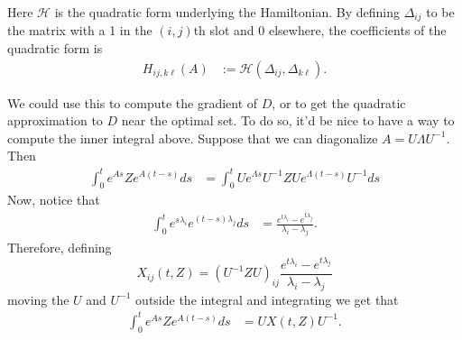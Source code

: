 \documentclass[9 pt]{article}
\newcommand{\calH}{\mathcal{H}}
\newcommand{\1}{\mathbbm{1}}
\begin{document}
Here $\calH$ is the quadratic form underlying the Hamiltonian.
By defining $\Delta_{ij}$ to be the matrix with a 1 in the $(i,j)$th slot
and 0 elsewhere,
the coefficients of the quadratic form is
\begin{equation}
    \begin{aligned}
        H_{ij, k\ell}(A)
        &:=
        \calH(\Delta_{ij}, \Delta_{k\ell}) .
    \end{aligned}
\end{equation}

We could use this to compute the gradient of $D$,
or to get the quadratic approximation to $D$ near the optimal set.
To do so, it'd be nice to have a way to compute the inner integral above.
Suppose that we can diagonalize $A = U \Lambda U^{-1}$.
Then
\begin{equation} \label{eqn:exp_deriv}
  \begin{aligned}
      \int_0^t e^{As} Z e^{A(t-s)} ds 
      &=
      \int_0^t U e^{\Lambda s} U^{-1} Z U e^{\Lambda (t-s)} U^{-1} ds 
  \end{aligned}
\end{equation}
Now, notice that
\begin{equation}
  \begin{aligned}
      \int_0^t e^{s \lambda_i} e^{(t-s) \lambda_j} ds
      &=
      \frac{ e^{t \lambda_i} - e^{t \lambda_j} }{ \lambda_i - \lambda_j } .
  \end{aligned}
\end{equation}
Therefore, 
defining
\begin{equation}
    X_{ij}(t,Z) = \left( U^{-1} Z U \right)_{ij}
      \frac{ e^{t \lambda_i} - e^{t \lambda_j} }{ \lambda_i - \lambda_j } 
\end{equation}
moving the $U$ and $U^{-1}$ outside the integral and integrating we get that
\begin{equation}
  \begin{aligned}
      \int_0^t e^{As} Z e^{A(t-s)} ds 
      &=
      U X(t,Z) U^{-1} .
  \end{aligned}
\end{equation}
\end{document}
